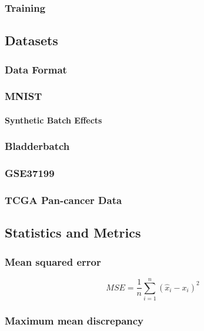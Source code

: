 \documentclass[titlepage]{article}
\begin{document}
\subsubsection{Training}

\subsection{Datasets}

\subsubsection{Data Format}

\subsubsection{MNIST}

\paragraph{Synthetic Batch Effects}

\subsubsection{Bladderbatch}

\subsubsection{GSE37199}

\subsubsection{TCGA Pan-cancer Data}

\subsection{Statistics and Metrics}

\subsubsection{Mean squared error}

\begin{equation}
	\label{mse}
	MSE = \frac{1}{n}\sum_{i=1}^n{(\hat{x}_i - x_i)^2}
\end{equation}

\subsubsection{Maximum mean discrepancy}
\end{document}
